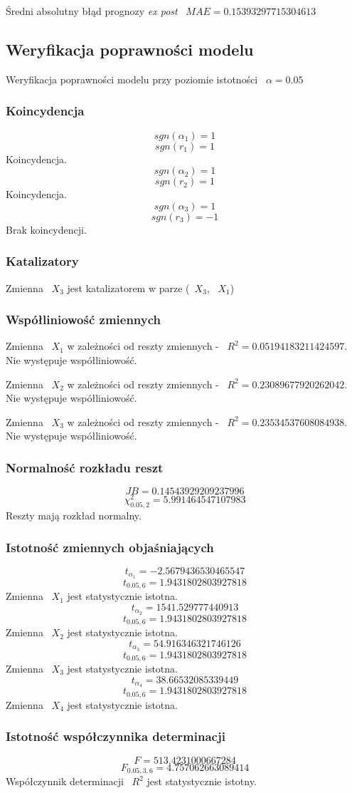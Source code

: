 \documentclass{article}
\begin{document}
Średni absolutny błąd prognozy \textit{ex post} ~$MAE = 0.15393297715304613$
\subsection{Weryfikacja poprawności modelu}
Weryfikacja poprawności modelu przy poziomie istotności ~$\alpha = 0.05$
\subsubsection{Koincydencja}
\[sgn(\alpha_1) = 1\]
\[sgn(r_1) = 1\]
Koincydencja.
\[sgn(\alpha_2) = 1\]
\[sgn(r_2) = 1\]
Koincydencja.
\[sgn(\alpha_3) = 1\]
\[sgn(r_3) = -1\]
Brak koincydencji.
\subsubsection{Katalizatory}
Zmienna ~$X_3$ jest katalizatorem w parze (~$X_3$, ~$X_1$)
\subsubsection{Współliniowość zmiennych}
Zmienna ~$X_1$ w zależności od reszty zmiennych - ~$R^2 = 0.05194183211424597$.
Nie występuje współliniowość.

Zmienna ~$X_2$ w zależności od reszty zmiennych - ~$R^2 = 0.23089677920262042$.
Nie występuje współliniowość.

Zmienna ~$X_3$ w zależności od reszty zmiennych - ~$R^2 = 0.23534537608084938$.
Nie występuje współliniowość.

\subsubsection{Normalność rozkładu reszt}
\[JB = 0.14543929209237996\]
\[\chi^2_{0.05, 2} = 5.991464547107983\]
Reszty mają rozkład normalny.
\subsubsection{Istotność zmiennych objaśniających}
\[t_{\alpha_1} = -2.5679436530465547\]
\[t_{0.05, 6} = 1.9431802803927818\]
Zmienna ~$X_1$ jest statystycznie istotna.
\[t_{\alpha_2} = 1541.529777440913\]
\[t_{0.05, 6} = 1.9431802803927818\]
Zmienna ~$X_2$ jest statystycznie istotna.
\[t_{\alpha_3} = 54.916346321746126\]
\[t_{0.05, 6} = 1.9431802803927818\]
Zmienna ~$X_3$ jest statystycznie istotna.
\[t_{\alpha_4} = 38.66532085339449\]
\[t_{0.05, 6} = 1.9431802803927818\]
Zmienna ~$X_4$ jest statystycznie istotna.
\subsubsection{Istotność współczynnika determinacji}
\[F = 513.4231000667284\]
\[F_{0.05, 3, 6} = 4.757062663089414\]
Współczynnik determinacji ~$R^2$ jest statystycznie istotny.
\end{document}
